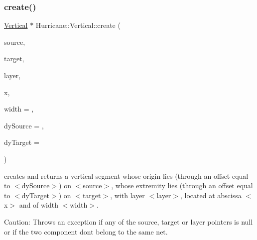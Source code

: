 \subsubsection{\texorpdfstring{create()}{create()}\hspace{0.1cm}{\footnotesize\ttfamily [2/2]}}
{\footnotesize\ttfamily \mbox{\hyperlink{classHurricane_1_1Vertical}{Vertical}} $\ast$ Hurricane\+::\+Vertical\+::create (\begin{DoxyParamCaption}\item[{\mbox{\hyperlink{classHurricane_1_1Component}{Component}} $\ast$}]{source,  }\item[{\mbox{\hyperlink{classHurricane_1_1Component}{Component}} $\ast$}]{target,  }\item[{const \mbox{\hyperlink{classHurricane_1_1Layer}{Layer}} $\ast$}]{layer,  }\item[{const \mbox{\hyperlink{group__DbUGroup_ga4fbfa3e8c89347af76c9628ea06c4146}{Db\+U\+::\+Unit}} \&}]{x,  }\item[{const \mbox{\hyperlink{group__DbUGroup_ga4fbfa3e8c89347af76c9628ea06c4146}{Db\+U\+::\+Unit}} \&}]{width = {},  }\item[{const \mbox{\hyperlink{group__DbUGroup_ga4fbfa3e8c89347af76c9628ea06c4146}{Db\+U\+::\+Unit}} \&}]{dy\+Source = {},  }\item[{const \mbox{\hyperlink{group__DbUGroup_ga4fbfa3e8c89347af76c9628ea06c4146}{Db\+U\+::\+Unit}} \&}]{dy\+Target = {} }\end{DoxyParamCaption})\hspace{0.3cm}{\ttfamily [static]}}

creates and returns a vertical segment whose origin lies (through an offset equal to {\ttfamily $<$dy\+Source$>$}) on {\ttfamily $<$source$>$}, whose extremity lies (through an offset equal to {\ttfamily $<$dy\+Target$>$}) on {\ttfamily $<$target$>$}, with layer {\ttfamily $<$layer$>$}, located at abscissa {\ttfamily $<$x$>$} and of width {\ttfamily $<$width$>$}.

\begin{DoxyParagraph}{Caution\+: Throws an exception if any of the source, target or layer }
pointers is null or if the two component don\textquotesingle{}t belong to the same net. 
\end{DoxyParagraph}
\mbox{\label{classHurricane_1_1Vertical_a798671c28c5e9848a92a6d1a9765e3ce}} 
